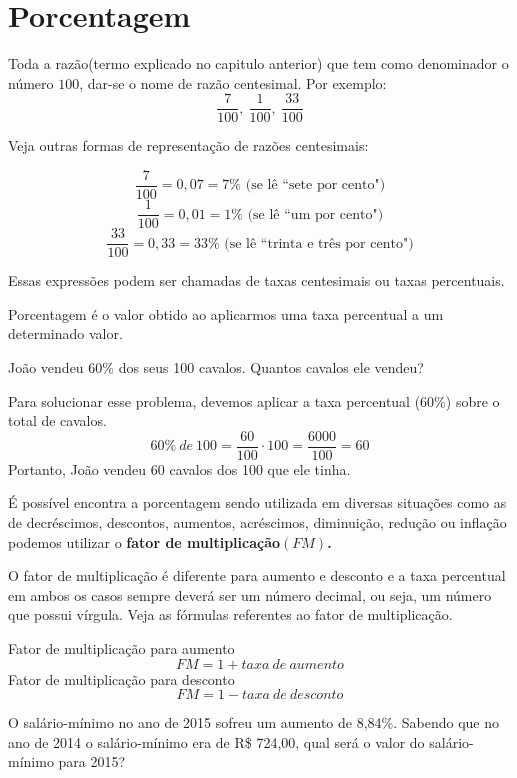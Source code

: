 \section{Porcentagem}
Toda a razão(termo explicado no capitulo anterior) que tem
como denominador o número $100$, dar-se o nome de razão centesimal. Por exemplo:
$$\frac{7}{100},~\frac{1}{100},~\frac{33}{100}$$

Veja outras formas de representação de razões centesimais:

$$\frac{7}{100}=0,07=7\% \textrm{ (se lê ``sete por cento")}$$
$$\frac{1}{100}=0,01=1\%\textrm{ (se lê ``um por cento")} $$
$$\frac{33}{100}=0,33=33\%\textrm{ (se lê ``trinta e três por cento")}$$

Essas expressões podem ser chamadas de taxas centesimais ou taxas percentuais. 

\begin{definition}
Porcentagem é o valor obtido ao aplicarmos uma taxa percentual a um determinado valor.

\end{definition}

\begin{example}
    João vendeu 60\% dos seus 100 cavalos. Quantos cavalos ele vendeu?
\end{example}

\begin{center}
    Para solucionar esse problema, devemos aplicar a taxa percentual (60\%) sobre o total de cavalos.
    $$60\%~de~100=\frac{60}{100}\cdot100=\frac{6000}{100}=60$$
    Portanto, João vendeu 60 cavalos dos 100 que ele tinha.
\end{center}

É possível encontra a porcentagem sendo utilizada em diversas situações como as de decréscimos, descontos, aumentos, acréscimos, diminuição, redução ou inflação podemos utilizar o \textbf{fator de multiplicação$(FM)$.}

\begin{definition}
O fator de multiplicação é diferente para aumento e desconto e a taxa percentual em ambos os casos sempre deverá ser um número decimal, ou seja, um número que possui vírgula. Veja as fórmulas referentes ao fator de multiplicação.
\end{definition}

\begin{center}
    Fator de multiplicação para aumento
    $$FM=1+taxa~de~aumento$$
    Fator de multiplicação para desconto
    $$FM=1-taxa~de~desconto$$
\end{center}
\begin{example}
    O salário-mínimo no ano de 2015 sofreu um aumento de 8,84\%. Sabendo que no ano de 2014 o salário-mínimo era de R\$ 724,00, qual será o valor do salário-mínimo para 2015?
\end{example}

